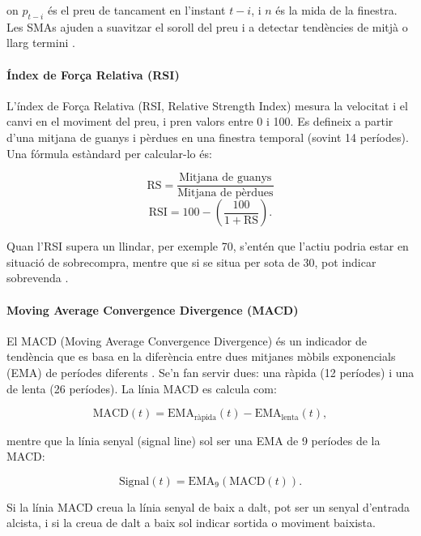 \documentclass[12pt,a4paper,twoside]{book}
\begin{document}
on $p_{t-i}$ és el preu de tancament en l'instant $t-i$, i $n$ és la mida de la finestra. Les SMAs ajuden a suavitzar el soroll del preu i a detectar tendències de mitjà o llarg termini \cite{InvestopediaSMA}.

\paragraph{Índex de Força Relativa (RSI)}
L'índex de Força Relativa (RSI, Relative Strength Index) mesura la velocitat i el canvi en el moviment del preu, i pren valors entre 0 i 100. Es defineix a partir d'una mitjana de guanys i pèrdues en una finestra temporal (sovint 14 períodes). Una fórmula estàndard per calcular-lo és:

\begin{equation}
    \text{RS} = \frac{\text{Mitjana de guanys}}{\text{Mitjana de pèrdues}}
\end{equation}
\begin{equation}
    \text{RSI} = 100 - \left( \frac{100}{1 + \text{RS}} \right).
\end{equation}

Quan l'RSI supera un llindar, per exemple 70, s'entén que l'actiu podria estar en situació de sobrecompra, mentre que si se situa per sota de 30, pot indicar sobrevenda \cite{InvestopediaRSI}.

\paragraph{Moving Average Convergence Divergence (MACD)}
El MACD (Moving Average Convergence Divergence) és un indicador de tendència que es basa en la diferència entre dues mitjanes mòbils exponencials (EMA) de períodes diferents \cite{InvestopediaMACD}. Se'n fan servir dues: una ràpida (12 períodes) i una de lenta (26 períodes). La línia MACD es calcula com:

\begin{equation}
    \text{MACD}(t) = \text{EMA}_{\text{ràpida}}(t) - \text{EMA}_{\text{lenta}}(t),
\end{equation}

mentre que la línia senyal (signal line) sol ser una EMA de 9 períodes de la MACD:

\begin{equation}
    \text{Signal}(t) = \text{EMA}_{9}(\text{MACD}(t)).
\end{equation}

Si la línia MACD creua la línia senyal de baix a dalt, pot ser un senyal d'entrada alcista, i si la creua de dalt a baix sol indicar sortida o moviment baixista.
\end{document}
